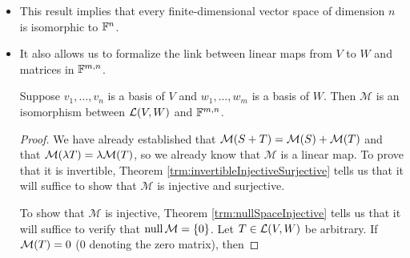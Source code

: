 \documentclass[../main.tex]{subfiles}
\begin{document}
\begin{itemize}
\begin{theorem}
\begin{proof}
            Now suppose that $\dim V=\dim W$. Let $v_1,\dots,v_n$ be a basis of $V$, and let $w_1,\dots,w_n$ be a basis of $W$. By Theorem \ref{trm:mapBasisToBasis}, there exists a unique linear map $T:V\to W$ such that $Tv_j=w_j$ for each $j=1,\dots,n$. To prove that $T$ is an isomorphism, Theorem \ref{trm:invertibleInjectiveSurjective} tells us that it will suffice to show that it is injective and surjective. To show that $T$ is surjective, it will suffice to show that $\range T=W=\spn(w_1,\dots,w_n)$. But since $Tv_j=w_j\in\range T$ for all $j=1,\dots,n$, $\range T\subset W$, and $\range T$ is a vector space (see Theorem \ref{trm:rangeSpace}), we have that $\range T=\spn(w_1,\dots,w_n)=W$, as desired. To prove that $T$ is injective, Theorem \ref{trm:nullSpaceInjective} tells us that it will suffice to show that $\nul T=\{0\}$, i.e., that $\dim\nul T=0$. But since $\dim\range T=\dim W=\dim V$, we have by the \hyperref[trm:fundamentalTheoremLinearMaps]{Fundamental Theorem of Linear Maps} that
            \begin{align*}
                \dim\nul T+\dim\range T &= \dim V\\
                &= \dim W\\
                &= \dim\range T\\
                \dim\nul T &= 0
            \end{align*}
            as desired.
        \end{proof}
    \end{theorem}
    \item This result implies that every finite-dimensional vector space of dimension $n$ is isomorphic to $\mathbb{F}^n$.
    \item It also allows us to formalize the link between linear maps from $V$ to $W$ and matrices in $\mathbb{F}^{m,n}$.
    \begin{theorem}\label{trm:mapsMatricesIsomorphic}
        Suppose $v_1,\dots,v_n$ is a basis of $V$ and $w_1,\dots,w_m$ is a basis of $W$. Then $\mathcal{M}$ is an isomorphism between $\mathcal{L}(V,W)$ and $\mathbb{F}^{m,n}$.
        \begin{proof}
            We have already established that $\mathcal{M}(S+T)=\mathcal{M}(S)+\mathcal{M}(T)$ and that $\mathcal{M}(\lambda T)=\lambda\mathcal{M}(T)$, so we already know that $\mathcal{M}$ is a linear map. To prove that it is invertible, Theorem \ref{trm:invertibleInjectiveSurjective} tells us that it will suffice to show that $\mathcal{M}$ is injective and surjective.\par
            To show that $\mathcal{M}$ is injective, Theorem \ref{trm:nullSpaceInjective} tells us that it will suffice to verify that $\operatorname{null}\mathcal{M}=\{0\}$. Let $T\in\mathcal{L}(V,W)$ be arbitrary. If $\mathcal{M}(T)=0$ (0 denoting the zero matrix), then

\end{proof}
\end{theorem}
\end{itemize}
\end{document}

